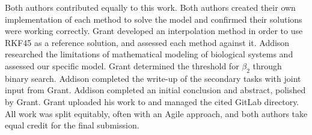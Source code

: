 Both authors contributed equally to this work. 
Both authors created their own implementation of each method to solve the model and confirmed their solutions were working correctly. 
Grant developed an interpolation method in order to use RKF45 as a reference solution, and assessed each method against it.
Addison researched the limitations of mathematical modeling of biological systems and assessed our specific model. 
Grant determined the threshold for $\beta_2$ through binary search.
Addison completed the write-up of the secondary tasks with joint input from Grant. 
Addison completed an initial conclusion and abstract, polished by Grant. 
Grant uploaded his work to and managed the cited GitLab directory. 
All work was split equitably, often with an Agile approach, and both authors take equal credit for the final submission.